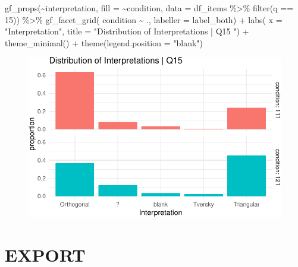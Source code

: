 \documentclass[
  letterpaper,
  DIV=11,
  numbers=noendperiod]{scrreprt}
\newenvironment{Shaded}{\begin{snugshade}}{\end{snugshade}}
\newcommand{\AttributeTok}[1]{\textcolor[rgb]{0.40,0.45,0.13}{#1}}
\newcommand{\DecValTok}[1]{\textcolor[rgb]{0.68,0.00,0.00}{#1}}
\newcommand{\FunctionTok}[1]{\textcolor[rgb]{0.28,0.35,0.67}{#1}}
\newcommand{\NormalTok}[1]{\textcolor[rgb]{0.00,0.23,0.31}{#1}}
\newcommand{\SpecialCharTok}[1]{\textcolor[rgb]{0.37,0.37,0.37}{#1}}
\newcommand{\StringTok}[1]{\textcolor[rgb]{0.13,0.47,0.30}{#1}}
\begin{document}
\begin{Shaded}
\begin{Highlighting}[]
\FunctionTok{gf\_props}\NormalTok{(}\SpecialCharTok{\textasciitilde{}}\NormalTok{interpretation, }\AttributeTok{fill =} \SpecialCharTok{\textasciitilde{}}\NormalTok{condition, }\AttributeTok{data =}\NormalTok{ df\_items }\SpecialCharTok{\%\textgreater{}\%} \FunctionTok{filter}\NormalTok{(q }\SpecialCharTok{==} \DecValTok{15}\NormalTok{)) }\SpecialCharTok{\%\textgreater{}\%}
  \FunctionTok{gf\_facet\_grid}\NormalTok{( condition }\SpecialCharTok{\textasciitilde{}}\NormalTok{ ., }\AttributeTok{labeller =}\NormalTok{ label\_both) }\SpecialCharTok{+} 
  \FunctionTok{labs}\NormalTok{( }\AttributeTok{x =} \StringTok{"Interpretation"}\NormalTok{, }\AttributeTok{title =} \StringTok{"Distribution of Interpretations | Q15 "}\NormalTok{) }\SpecialCharTok{+} 
  \FunctionTok{theme\_minimal}\NormalTok{() }\SpecialCharTok{+} \FunctionTok{theme}\NormalTok{(}\AttributeTok{legend.position =} \StringTok{"blank"}\NormalTok{)}
\end{Highlighting}
\end{Shaded}

\begin{figure}[H]

{\centering \includegraphics{analysis/SGC3A/2_sgc3A_scoring_files/figure-pdf/Q15-distribution-2.pdf}

}

\end{figure}

\hypertarget{export-1}{%
\section{EXPORT}\label{export-1}}
\end{document}
